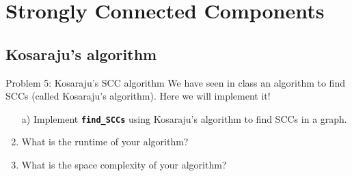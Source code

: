 \documentclass{article}
\begin{document}
\section{Strongly Connected Components}



\subsection{Kosaraju's algorithm}
\begin{problem}{Problem 5: Kosaraju's SCC algorithm}
    We have seen in class an algorithm to find SCCs (called Kosaraju’s algorithm). Here we will implement it!

    \begin{enumerate}
        \item[a)] Implement \textbf{\lstinline{find_SCCs}} using Kosaraju's algorithm to find SCCs in a graph.
        \item[b)] What is the runtime of your algorithm?
        \item[C)] What is the space complexity of your algorithm?
    \end{enumerate}
\end{problem}
\end{document}
